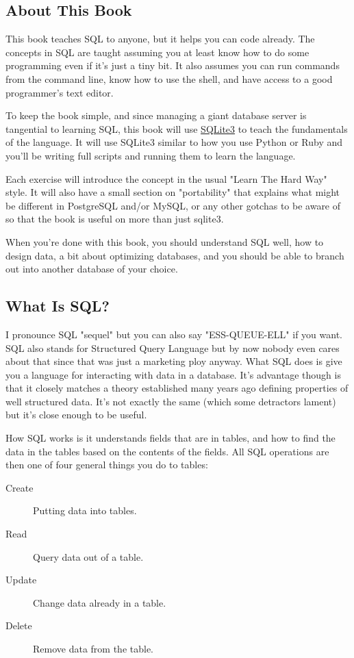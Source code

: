 \subsection*{About This Book}

This book teaches SQL to anyone, but it helps you can code already.  The 
concepts in SQL are taught assuming you at least know how to do some programming
even if it's just a tiny bit.  It also assumes you can run commands from the
command line, know how to use the shell, and have access to a good programmer's
text editor.

To keep the book simple, and since managing a giant database server is tangential
to learning SQL, this book will use \href{http://sqlite.org}{SQLite3} to teach
the fundamentals of the language.  It will use SQLite3 similar to how you use
Python or Ruby and you'll be writing full  scripts and running them
to learn the language.  

Each exercise will introduce the concept in the usual "Learn The Hard Way" style.
It will also have a small section on "portability" that explains what might be
different in PostgreSQL and/or MySQL, or any other gotchas to be aware of so that
the book is useful on more than just sqlite3.

When you're done with this book, you should understand SQL well, how to design
data, a bit about optimizing databases, and you should be able to branch out into
another database of your choice.

\subsection*{What Is SQL?}

I pronounce SQL "sequel" but you can also say "ESS-QUEUE-ELL" if you want. SQL
also stands for Structured Query Language but by now nobody even cares about
that since that was just a marketing ploy anyway. What SQL does is give you a
language for interacting with data in a database.  It's advantage though is
that it closely matches a theory established many years ago defining properties
of well structured data.  It's not exactly the same (which some detractors
lament) but it's close enough to be useful.

How SQL works is it understands fields that are in tables, and how to find the
data in the tables based on the contents of the fields.  All SQL operations are
then one of four general things you do to tables:

\begin{description}
\item[Create] Putting data into tables.
\item[Read] Query data out of a table.
\item[Update] Change data already in a table.
\item[Delete] Remove data from the table.
\end{description}

